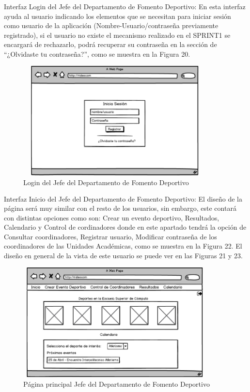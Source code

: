 	Interfaz Login del Jefe del Departamento de Fomento Deportivo: En esta interfaz ayuda al usuario indicando los elementos que se necesitan para iniciar sesión como usuario de la aplicación (Nombre-Usuario/contraseña previamente registrado), si el usuario no existe el mecanismo realizado en el SPRINT1 se encargará de rechazarlo, podrá recuperar su contraseña en la sección de “¿Olvidaste tu contraseña?”, como se muestra en la Figura 20.\pagebreak
	\begin{figure}[hbt!]
		\centering
		\includegraphics[width=10cm, height=6cm]{Imagenes/Disenos/LoginJFD.png}
		\caption{Login del Jefe del Departamento de Fomento Deportivo}
	\end{figure}
	
	Interfaz Inicio del Jefe del Departamento de Fomento Deportivo: El diseño de la página será muy similar con el resto de los usuarios, sin embargo, este contará con distintas opciones como son: Crear un evento deportivo, Resultados, Calendario y Control de cordinadores donde en este apartado tendrá la opción de Consultar coordinadores, Registrar usuario, Modificar contraseña de los coordinadores de las Unidades Académicas, como se muestra en la Figura 22. El diseño en general de la vista de este usuario se puede ver en  las Figuras 21 y 23.
	\begin{figure}[hbt!]
		\centering
		\includegraphics[width=10cm, height=6cm]{Imagenes/Disenos/InicioJFD.png}
		\caption{Página principal Jefe del Departamento de Fomento Deportivo}
	\end{figure}
	
